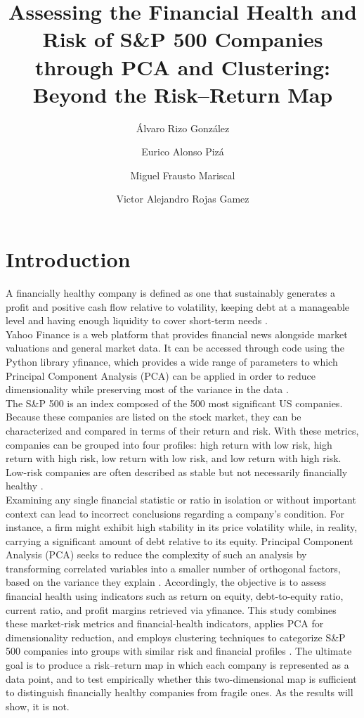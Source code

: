 \documentclass[eng]{ajceam-class}
\title{Assessing the Financial Health and Risk of S\&P 500 Companies through PCA and Clustering: Beyond the Risk--Return Map}
\author[1]{Álvaro Rizo González}
\author[2]{Eurico Alonso Pizá}
\author[3]{Miguel Frausto Mariscal}
\author[4]{Victor Alejandro Rojas Gamez}
\affil{Tecnológico de Monterrey, Campus Guadalajara}
\begin{document}
\maketitle
\thispagestyle{fancy}
\printcontactdata

\section{Introduction}

A financially healthy company is defined as one that sustainably generates a profit and positive cash flow relative to volatility, keeping debt at a manageable level and having enough liquidity to cover short-term needs \cite{almansoor2023}.\\

Yahoo Finance is a web platform that provides financial news alongside market valuations and general market data. It can be accessed through code using the Python library yfinance, which provides a wide range of parameters to which Principal Component Analysis (PCA) can be applied in order to reduce dimensionality while preserving most of the variance in the data \cite{aroussi2017}.\\

The S\&P 500 is an index composed of the 500 most significant US companies. Because these companies are listed on the stock market, they can be characterized and compared in terms of their return and risk. With these metrics, companies can be grouped into four profiles: high return with low risk, high return with high risk, low return with low risk, and low return with high risk. Low-risk companies are often described as stable but not necessarily financially healthy \cite{sp500_2024}.\\

Examining any single financial statistic or ratio in isolation or without important context can lead to incorrect conclusions regarding a company’s condition. For instance, a firm might exhibit high stability in its price volatility while, in reality, carrying a significant amount of debt relative to its equity. Principal Component Analysis (PCA) seeks to reduce the complexity of such an analysis by transforming correlated variables into a smaller number of orthogonal factors, based on the variance they explain \cite{caci2023}. Accordingly, the objective is to assess financial health using indicators such as return on equity, debt-to-equity ratio, current ratio, and profit margins retrieved via yfinance. This study combines these market-risk metrics and financial-health indicators, applies PCA for dimensionality reduction, and employs clustering techniques to categorize S\&P 500 companies into groups with similar risk and financial profiles \cite{almansoor2023}. The ultimate goal is to produce a risk–return map in which each company is represented as a data point, and to test empirically whether this two-dimensional map is sufficient to distinguish financially healthy companies from fragile ones. As the results will show, it is not.\\
\end{document}
